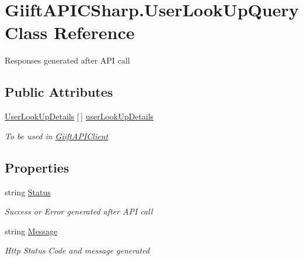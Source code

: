 \hypertarget{class_giift_a_p_i_c_sharp_1_1_user_look_up_query}{}\section{Giift\+A\+P\+I\+C\+Sharp.\+User\+Look\+Up\+Query Class Reference}
\label{class_giift_a_p_i_c_sharp_1_1_user_look_up_query}


Responses generated after A\+PI call  


\subsection*{Public Attributes}
\begin{DoxyCompactItemize}
\item 
\hyperlink{class_giift_a_p_i_c_sharp_1_1_user_look_up_details}{User\+Look\+Up\+Details} \mbox{[}$\,$\mbox{]} \hyperlink{class_giift_a_p_i_c_sharp_1_1_user_look_up_query_a517cd7c8c5ed43169a5a6663ce61321d}{user\+Look\+Up\+Details}
\begin{DoxyCompactList}\small\item\em To be used in \hyperlink{class_giift_a_p_i_c_sharp_1_1_giift_a_p_i_client}{Giift\+A\+P\+I\+Client} \end{DoxyCompactList}\end{DoxyCompactItemize}
\subsection*{Properties}
\begin{DoxyCompactItemize}
\item 
string \hyperlink{class_giift_a_p_i_c_sharp_1_1_user_look_up_query_a0e0858d7e1576692f53803749ee822fc}{Status}
\begin{DoxyCompactList}\small\item\em Success or Error generated after A\+PI call \end{DoxyCompactList}\item 
string \hyperlink{class_giift_a_p_i_c_sharp_1_1_user_look_up_query_aa4958393327a7999fcf1495b9cd37cea}{Message}
\begin{DoxyCompactList}\small\item\em Http Status Code and message generated \end{DoxyCompactList}\end{DoxyCompactItemize}


